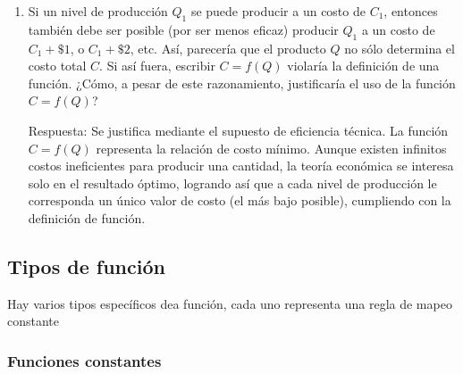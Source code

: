 \begin{ejercicio}
\begin{enumerate}
  (a) De acuerdo con la definición de una función, ¿se debe relacionar cada cifra de costo con un nivel de producción único?

  Respuesta: La definición de función exige que para cada \(Q\) haya un solo \(C\), pero no obliga a que para cada \(C\) haya un solo \(Q\). Podría ser que producir \(10\) unidades cueste \(\mathdollar{100}\) y producir \(12\) unidades (por una gran eficiencia) también cueste \(\mathdollar{100}\). Eso sigue siendo una función. Lo que no puede pasar es que producir 10 unidades cueste \(\mathdollar{100}\) y \(\mathdollar{200}\) al mismo tiempo.

  (b) ¿Cada nivel de producción debe determinar una cifra de costo única?

  Respuesta: Si, a cada nivel de producción se le debe asignar solo una cifra de costo, esto para mantener la unicidad de la función. Es decir para una cantidad \(Q\) no puedo tener dos costos distintos.
  \item Si un nivel de producción \(Q_1\) se puede producir a un costo de \(C_1\), entonces también debe ser posible (por ser menos eficaz) producir \(Q_1\) a un costo de \(C_1 + \mathdollar{1}\), o \(C_1 + \mathdollar{2}\), etc. Así, parecería que el producto \(Q\) no sólo determina el costo total \(C\). Si así fuera, escribir \(C = f(Q)\) violaría la definición de una función. ¿Cómo, a pesar de este razonamiento, justificaría el uso de la función \(C = f(Q)\)?
  
  Respuesta: Se justifica mediante el supuesto de eficiencia técnica. La función \(C=f(Q)\) representa la relación de costo mínimo. Aunque existen infinitos costos ineficientes para producir una cantidad, la teoría económica se interesa solo en el resultado óptimo, logrando así que a cada nivel de producción le corresponda un único valor de costo (el más bajo posible), cumpliendo con la definición de función.
\end{enumerate}
\end{ejercicio}




\subsection{Tipos de función}

Hay varios tipos específicos dea función, cada uno representa una regla de mapeo constante

\subsubsection{Funciones constantes}

